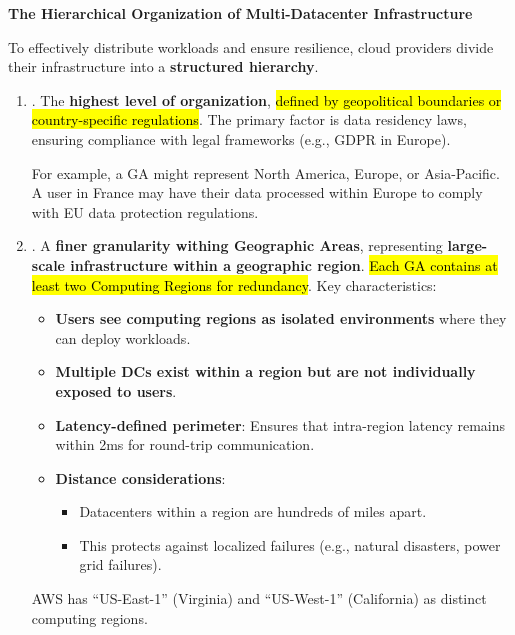 \highspace
\begin{flushleft}
    \textcolor{Green3}{ \textbf{The Hierarchical Organization of Multi-Datacenter Infrastructure}}
\end{flushleft}
To effectively distribute workloads and ensure resilience, cloud providers divide their infrastructure into a \textbf{structured hierarchy}.
\begin{enumerate}
    \item {}. The \textbf{highest level of organization}, \hl{defined by geopolitical boundaries or country-specific regulations}. The primary factor is data residency laws, ensuring compliance with legal frameworks (e.g., GDPR in Europe).
    \begin{examplebox}
        For example, a GA might represent North America, Europe, or Asia-Pacific. A user in France may have their data processed within Europe to comply with EU data protection regulations.
    \end{examplebox}

    \newpage

    \item {}. A \textbf{finer granularity withing Geographic Areas}, representing \textbf{large-scale infrastructure within a geographic region}. \hl{Each GA contains at least two Computing Regions for redundancy}. Key characteristics:
    \begin{itemize}
        \item \textbf{Users see computing regions as isolated environments} where they can deploy workloads.
        \item \textbf{Multiple DCs exist within a region but are not individually exposed to users}.
        \item \textbf{Latency-defined perimeter}: Ensures that intra-region latency remains within 2ms for round-trip communication.
        \item \textbf{Distance considerations}:
        \begin{itemize}
            \item Datacenters within a region are hundreds of miles apart.
            \item This protects against localized failures (e.g., natural disasters, power grid failures).
        \end{itemize}
    \end{itemize}

    \begin{examplebox}
        AWS has ``US-East-1'' (Virginia) and ``US-West-1'' (California) as distinct computing regions.
    \end{examplebox}



\end{enumerate}
